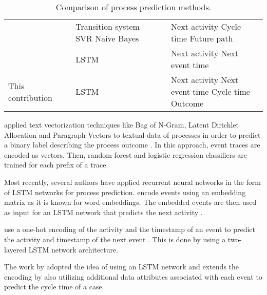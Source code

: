 \begin{table}[htbp!]
\begin{tabularx}{\textwidth}{
			>{\hsize=2.0\hsize}X
			>{\hsize=0.4\hsize}X
			>{\hsize=1.3\hsize}X
			>{\hsize=0.5\hsize}X
			>{\hsize=0.5\hsize}X
			>{\hsize=1.3\hsize}X
		}
		\citeauthor{DBLP:journals/computing/PolatoSBL18} \cite{DBLP:journals/computing/PolatoSBL18}&  \citeyear{DBLP:journals/computing/PolatoSBL18} &  Transition system \newline SVR \newline Naive Bayes &  \checkmark & \xmark & Next activity \newline Cycle time \newline Future path \\
		
		\citeauthor{DBLP:conf/icpm/ParkS19} \cite{DBLP:conf/icpm/ParkS19} & \citeyear{DBLP:conf/icpm/ParkS19} & LSTM & \checkmark & \xmark &Next activity \newline Next event time  \\
		
		This contribution &  2020 &  LSTM & \checkmark & \checkmark &  Next activity \newline Next event time  \newline Cycle time \newline Outcome
		\\ \bottomrule
	\end{tabularx}
	\caption[Comparison  of process prediction methods]{Comparison  of process prediction methods.}
	\label{tab:preliminaries}
\end{table}

\citeauthor{DBLP:conf/bpm/TeinemaaDMF16} applied text vectorization techniques like Bag of N-Gram, Latent Dirichlet Allocation and Paragraph Vectors to textual data of processes in order to predict a binary label describing the process outcome \cite{DBLP:conf/bpm/TeinemaaDMF16}.
In this approach, event traces are encoded as vectors.
Then, random forest and logistic regression classifiers are trained for each prefix of a trace.

Most recently, several authors have applied recurrent neural networks in the form of LSTM networks for process prediction. \citeauthor{ DBLP:conf/bpm/EvermannRF16} encode events using an embedding matrix as it is known for word embeddings.
The embedded events are then used as input for an LSTM network that predicts the next activity \cite{DBLP:conf/bpm/EvermannRF16}.

\citeauthor{DBLP:conf/caise/TaxVRD17} use a one-hot encoding of the activity and the timestamp of an event to predict the activity and timestamp of the next event \cite{DBLP:conf/caise/TaxVRD17}.
This is done by using a two-layered LSTM network architecture.

The work by \citeauthor{DBLP:conf/ssci/NavarinVPS17} adopted the idea of using an LSTM network \cite{DBLP:conf/caise/TaxVRD17} and extends the encoding by also utilizing additional data attributes associated with each event \cite{DBLP:conf/ssci/NavarinVPS17} to predict the cycle time of a case.

